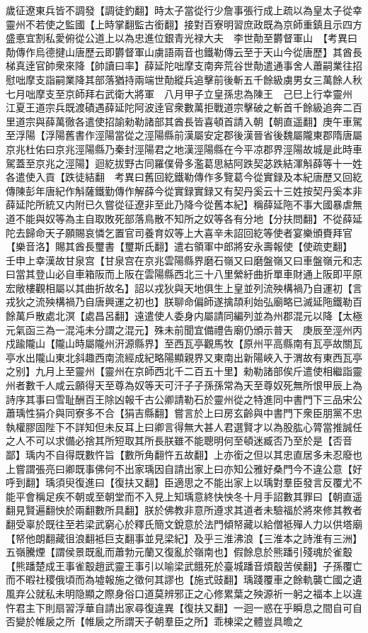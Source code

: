 歲征遼東兵皆不調發【調徒釣翻】時太子當從行少詹事張行成上疏以為皇太子從幸靈州不若使之監國【上時掌翻監古銜翻】接對百寮明習庶政既為京師重鎮且示四方盛悳宜割私愛俯從公道上以為忠進位銀青光禄大夫　李世勣至欝督軍山　【考異曰勣傳作烏德揵山唐歷云即欝督軍山虜語兩音也鐵勒傳云至于天山今從唐歷】其酋長梯真逹官帥衆來降【帥讀曰率】薛延陀咄摩支南奔荒谷世勣遣通事舍人蕭嗣業往招慰咄摩支詣嗣業降其部落猶持兩端世勣縱兵追擊前後斬五千餘級虜男女三萬餘人秋七月咄摩支至京師拜右武衛大將軍　八月甲子立皇孫忠為陳王　己巳上行幸靈州　江夏王道宗兵既渡磧遇薛延陀阿波逹官衆數萬拒戰道宗擊破之斬首千餘級追奔二百里道宗與薛萬徹各遣使招諭勑勒諸部其酋長皆喜頓首請入朝【朝直遥翻】庚午車駕至浮陽【浮陽舊書作涇陽當從之涇陽縣前漢屬安定郡後漢晉省後魏屬隴東郡隋唐屬京兆杜佑曰京兆涇陽縣乃秦封涇陽君之地漢涇陽縣在今平凉郡界涇陽故城是此時車駕蓋至京兆之涇陽】迴紇拔野古同羅僕骨多濫葛思結阿跌契苾跌結渾斛薛等十一姓各遣使入貢【跌徒結翻　考異曰舊回紇鐵勒傳作多覽葛今從實録及本紀唐歷又回紇傳陳彭年唐紀作斛薩鐵勤傳作解薛今從實録實録又有契丹奚云十三姓按契丹奚本非薛延陀所統又内附已久嘗從征遼非至此乃降今從舊本紀】稱薛延陁不事大國暴虐無道不能與奴等為主自取敗死部落鳥散不知所之奴等各有分地【分扶問翻】不從薛延陀去歸命天子願賜哀憐乞置官司養育奴等上大喜辛未詔回紇等使者宴樂頒賚拜官【樂音洛】賜其酋長璽書【璽斯氏翻】遣右領軍中郎將安永壽報使【使疏吏翻】　壬申上幸漢故甘泉宫【甘泉宫在京兆雲陽縣界磨石嶺又曰磨盤嶺又曰車盤嶺元和志曰當其登山必自車箱阪而上阪在雲陽縣西北三十八里縈紆曲折單車財通上阪即平原宏敞樓觀相屬以其曲折故名】詔以戎狄與天地俱生上皇並列流殃構禍乃自運初【言戎狄之流殃構禍乃自唐興運之初也】朕聊命偏師遂擒頡利始弘廟略已滅延陁鐵勒百餘萬戶散處北溟【處昌呂翻】遠遣使人委身内屬請同編列並為州郡混元以降【太極元氣函三為一混沌未分謂之混元】殊未前聞宜備禮告廟仍頒示普天　庚辰至涇州丙戍踰隴山【隴山時屬隴州汧源縣界】至西瓦亭觀馬牧【原州平高縣南有瓦亭故關瓦亭水出隴山東北斜趣西南流經成紀略陽顯親界又東南出新陽峽入于渭故有東西瓦亭之别】九月上至靈州【靈州在京師西北千二百五十里】勑勒諸部俟斤遣使相繼詣靈州者數千人咸云願得天至尊為奴等天可汗子子孫孫常為天至尊奴死無所恨甲辰上為詩序其事曰雪耻酬百王除凶報千古公卿請勒石於靈州從之特進同中書門下三品宋公蕭瑀性狷介與同寮多不合【狷吉縣翻】嘗言於上曰房玄齡與中書門下衆臣朋黨不忠執權膠固陛下不詳知但未反耳上曰卿言得無大甚人君選賢才以為股肱心膂當推誠任之人不可以求備必捨其所短取其所長朕雖不能聰明何至頓迷臧否乃至於是【否音鄙】瑀内不自得既數忤旨【數所角翻忤五故翻】上亦銜之但以其忠直居多未忍廢也上嘗謂張亮曰卿既事佛何不出家瑀因自請出家上曰亦知公雅好桑門今不違公意【好呼到翻】瑀須臾復進曰【復扶又翻】臣適思之不能出家上以瑀對羣臣發言反覆尤不能平會稱足疾不朝或至朝堂而不入見上知瑀意終快怏冬十月手詔數其罪曰【朝直遥翻見賢遍翻怏於兩翻數所具翻】朕於佛教非意所遵求其道者未驗福於將來修其教者翻受辜於既往至若梁武窮心於釋氏簡文銳意於法門傾帑藏以給僧袛殫人力以供塔廟【帑他朗翻藏徂浪翻袛巨支翻事並見梁紀】及乎三淮沸浪【三淮本之詩淮有三洲】五嶺騰煙【謂侯景既亂而蕭勃元蘭又復亂於嶺南也】假餘息於熊蹯引殘魂於雀鷇【熊蹯楚成王事雀鷇趙武靈王事引以喻梁武餓死於臺城蹯音煩鷇苦侯翻】子孫覆亡而不暇社稷俄頃而為墟報施之徵何其謬也【施式豉翻】瑀踐覆車之餘軌襲亡國之遺風弃公就私未明隐顯之際身俗口道莫辨邪正之心修累葉之殃源祈一躬之福本上以違忤君主下則扇習浮華自請出家尋復違異【復扶又翻】一迴一惑在乎瞬息之間自可自否變於帷扆之所【帷扆之所謂天子朝羣臣之所】乖棟梁之體豈具曕之